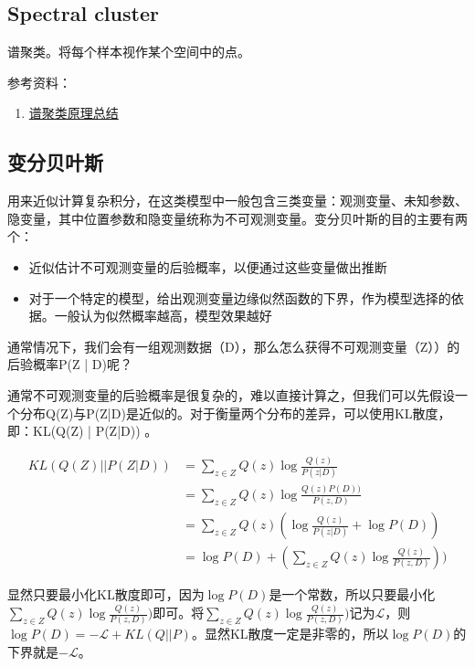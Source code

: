 \subsection{Spectral cluster}
谱聚类。将每个样本视作某个空间中的点。

参考资料：
\begin{enumerate}
	\item \href{https://www.cnblogs.com/pinard/p/6221564.htm}{谱聚类原理总结}
\end{enumerate}


\subsection{变分贝叶斯}
用来近似计算复杂积分，在这类模型中一般包含三类变量：观测变量、未知参数、隐变量，其中位置参数和隐变量统称为不可观测变量。变分贝叶斯的目的主要有两个：
\begin{itemize}
	\item 近似估计不可观测变量的后验概率，以便通过这些变量做出推断
	\item 对于一个特定的模型，给出观测变量边缘似然函数的下界，作为模型选择的依据。一般认为似然概率越高，模型效果越好
\end{itemize}
通常情况下，我们会有一组观测数据（D），那么怎么获得不可观测变量（Z））的后验概率P(Z | D)呢？

通常不可观测变量的后验概率是很复杂的，难以直接计算之，但我们可以先假设一个分布Q(Z)与P(Z|D)是近似的。对于衡量两个分布的差异，可以使用KL散度，即：KL(Q(Z) | P(Z|D)) 。

$$
\begin{equation}\nonumber
	\begin{aligned}
		KL(Q(Z) || P(Z|D)) &= \sum_{z \in Z} Q(z) \log \frac{Q(z)}{P(z|D)} \\
		&= \sum_{z \in Z} Q(z) \log \frac{Q(z) P(D) )}{P(z, D) } \\	
		&= \sum_{z \in Z} Q(z) ( \log \frac{Q(z)}{P(z|D)} + \log P(D) ) \\
		&= \log P(D) + ( \sum_{z \in Z} Q(z) \log \frac{Q(z)}{P(z, D)}) ) 
	\end{aligned}
\end{equation}
$$

显然只要最小化KL散度即可，因为$\log P(D)$是一个常数，所以只要最小化$\sum_{z \in Z} Q(z) \log \frac{Q(z)}{P(z, D)})$即可。将$\sum_{z \in Z} Q(z) \log \frac{Q(z)}{P(z, D)})$记为$\mathcal{L}$，则$\log P(D) = -\mathcal{L} + KL(Q || P)$。显然KL散度一定是非零的，所以$\log P(D)$的下界就是$-\mathcal{L}$。


